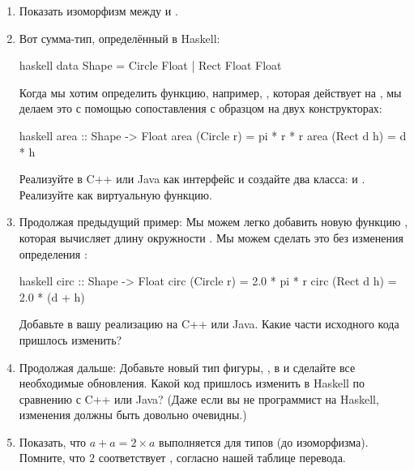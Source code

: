 \begin{enumerate}
  \tightlist
  \item
        Показать изоморфизм между  и
        .
  \item
        Вот сумма-тип, определённый в Haskell:

        \begin{snip}{haskell}
data Shape = Circle Float
           | Rect Float Float
\end{snip}
        Когда мы хотим определить функцию, например, , которая действует на , мы делаем это с помощью сопоставления с образцом на двух конструкторах:

        \begin{snip}{haskell}
area :: Shape -> Float
area (Circle r) = pi * r * r
area (Rect d h) = d * h
\end{snip}
        Реализуйте  в C++ или Java как интерфейс и создайте два класса:  и . Реализуйте  как виртуальную функцию.
  \item
        Продолжая предыдущий пример: Мы можем легко добавить новую функцию , которая вычисляет длину окружности . Мы можем сделать это без изменения определения :

        \begin{snip}{haskell}
circ :: Shape -> Float
circ (Circle r) = 2.0 * pi * r
circ (Rect d h) = 2.0 * (d + h)
\end{snip}
        Добавьте  в вашу реализацию на C++ или Java. Какие части исходного кода пришлось изменить?
  \item
        Продолжая дальше: Добавьте новый тип фигуры, , в  и сделайте все необходимые обновления. Какой код пришлось изменить в Haskell по сравнению с C++ или Java? (Даже если вы не программист на Haskell, изменения должны быть довольно очевидны.)
  \item
        Показать, что $a + a = 2 \times a$ выполняется для типов (до изоморфизма). Помните, что $2$ соответствует , согласно нашей таблице перевода.
\end{enumerate}